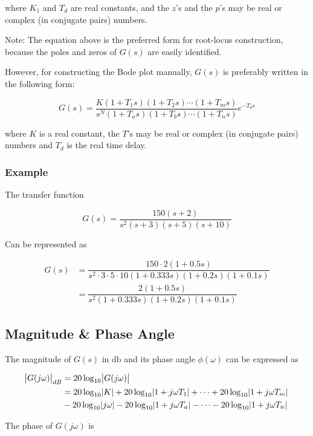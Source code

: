 \documentclass[
  14pt,
  a4paper,
  oneside,
  open=any,
  a4paper,
  14pt]{report}
\begin{document}
where \(K_1\) and \(T_d\) are real constants, and the \(z\)'s and the
\(p\)'s may be real or complex (in conjugate pairs) numbers.

Note: The equation above is the preferred form for root-locus
construction, because the poles and zeros of \(G(s)\) are easily
identified.

However, for constructing the Bode plot manually, \(G(s)\) is preferably
written in the following form:

\[
    G(s) = \dfrac{K(1+T_1s)(1+T_2s)\cdots(1+T_ms)}{s^N(1+T_as)(1+T_bs)\cdots(1+T_ns)} e^{-T_ds}
\]

where \(K\) is a real constant, the \(T\)'s may be real or complex (in
conjugate pairs) numbers and \(T_d\) is the real time delay.

\subsubsection{Example}\label{example-6}

The transfer function

\[
    G(s) = \dfrac{150(s+2)}{s^2(s+3)(s+5)(s+10)}
\]

Can be represented as

\[
\begin{aligned}
    G(s) &= \dfrac{150 \cdot 2(1+0.5s)}{s^2\cdot 3\cdot 5\cdot 10(1+0.333s)(1+0.2s)(1+0.1s)}\\
    &= \dfrac{2(1+0.5s)}{s^2(1+0.333s)(1+0.2s)(1+0.1s)}
\end{aligned}
\]

\subsection{Magnitude \& Phase Angle}\label{magnitude-phase-angle}

The magnitude of \(G(s)\) in \(\unit{\decibel}\) and its phase angle
\(\phi(\omega)\) can be expressed as

\[
\begin{aligned}
    \abs{G(j\omega)}_{dB} &= 20\log_{10}\abs{G(j\omega)} \\
    &= 20\log_{10}\abs{K} + 20\log_{10}\abs{1+j\omega T_1} + \cdots + 20\log_{10}\abs{1+j\omega T_m} \\
    &- 20\log_{10}\abs{j\omega} - 20\log_{10}\abs{1+j\omega T_a} - \cdots - 20\log_{10}\abs{1+j\omega T_n}
\end{aligned}
\]

The phase of \(G(j\omega)\) is
\end{document}
